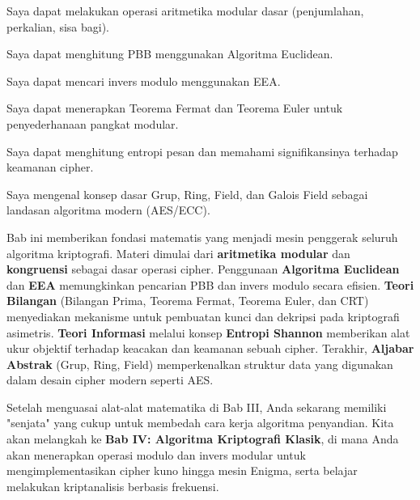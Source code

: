 \documentclass[main.tex]{subfiles}
\begin{document}

\begin{checklist}
  \item Saya dapat melakukan operasi aritmetika modular dasar (penjumlahan, perkalian, sisa bagi).
  \item Saya dapat menghitung PBB menggunakan Algoritma Euclidean.
  \item Saya dapat mencari invers modulo menggunakan EEA.
  \item Saya dapat menerapkan Teorema Fermat dan Teorema Euler untuk penyederhanaan pangkat modular.
  \item Saya dapat menghitung entropi pesan dan memahami signifikansinya terhadap keamanan cipher.
  \item Saya mengenal konsep dasar Grup, Ring, Field, dan Galois Field sebagai landasan algoritma modern (AES/ECC).
\end{checklist}


\begin{rangkuman}
Bab ini memberikan fondasi matematis yang menjadi mesin penggerak seluruh algoritma kriptografi. Materi dimulai dari \textbf{aritmetika modular} dan \textbf{kongruensi} sebagai dasar operasi cipher. Penggunaan \textbf{Algoritma Euclidean} dan \textbf{EEA} memungkinkan pencarian PBB dan invers modulo secara efisien. \textbf{Teori Bilangan} (Bilangan Prima, Teorema Fermat, Teorema Euler, dan CRT) menyediakan mekanisme untuk pembuatan kunci dan dekripsi pada kriptografi asimetris. \textbf{Teori Informasi} melalui konsep \textbf{Entropi Shannon} memberikan alat ukur objektif terhadap keacakan dan keamanan sebuah cipher. Terakhir, \textbf{Aljabar Abstrak} (Grup, Ring, Field) memperkenalkan struktur data yang digunakan dalam desain cipher modern seperti AES.
\end{rangkuman}

\begin{transition}
Setelah menguasai alat-alat matematika di Bab III, Anda sekarang memiliki "senjata" yang cukup untuk membedah cara kerja algoritma penyandian. Kita akan melangkah ke \textbf{Bab IV: Algoritma Kriptografi Klasik}, di mana Anda akan menerapkan operasi modulo dan invers modular untuk mengimplementasikan cipher kuno hingga mesin Enigma, serta belajar melakukan kriptanalisis berbasis frekuensi.
\end{transition}

\ifSubfilesClassLoaded{
  \renewcommand{\bibname}{Daftar Pustaka}
  
  
}{}
\end{document}
